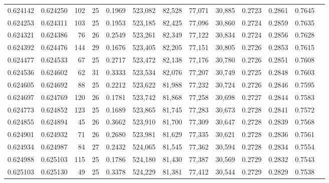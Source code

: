 \begin{tabular}{rrrrrrrrrrrrr}
0.624142 & 0.624250 & 102 &  25 &                                     0.1969 & 523,082 &  82,528 &  77,071 &  30,885 & 0.2723 & 0.2861 & 0.7645 \\
0.624253 & 0.624311 & 103 &  25 &                                     0.1953 & 523,185 &  82,425 &  77,096 &  30,860 & 0.2724 & 0.2859 & 0.7635 \\
0.624321 & 0.624386 &  76 &  26 &                                     0.2549 & 523,261 &  82,349 &  77,122 &  30,834 & 0.2724 & 0.2856 & 0.7628 \\
0.624392 & 0.624476 & 144 &  29 &                                     0.1676 & 523,405 &  82,205 &  77,151 &  30,805 & 0.2726 & 0.2853 & 0.7615 \\
0.624477 & 0.624533 &  67 &  25 &                                     0.2717 & 523,472 &  82,138 &  77,176 &  30,780 & 0.2726 & 0.2851 & 0.7608 \\
0.624536 & 0.624602 &  62 &  31 &                                     0.3333 & 523,534 &  82,076 &  77,207 &  30,749 & 0.2725 & 0.2848 & 0.7603 \\
0.624605 & 0.624692 &  88 &  25 &                                     0.2212 & 523,622 &  81,988 &  77,232 &  30,724 & 0.2726 & 0.2846 & 0.7595 \\
0.624697 & 0.624769 & 120 &  26 &                                     0.1781 & 523,742 &  81,868 &  77,258 &  30,698 & 0.2727 & 0.2844 & 0.7583 \\
0.624773 & 0.624852 & 123 &  25 &                                     0.1689 & 523,865 &  81,745 &  77,283 &  30,673 & 0.2728 & 0.2841 & 0.7572 \\
0.624855 & 0.624894 &  45 &  26 &                                     0.3662 & 523,910 &  81,700 &  77,309 &  30,647 & 0.2728 & 0.2839 & 0.7568 \\
0.624901 & 0.624932 &  71 &  26 &                                     0.2680 & 523,981 &  81,629 &  77,335 &  30,621 & 0.2728 & 0.2836 & 0.7561 \\
0.624934 & 0.624987 &  84 &  27 &                                     0.2432 & 524,065 &  81,545 &  77,362 &  30,594 & 0.2728 & 0.2834 & 0.7554 \\
0.624988 & 0.625103 & 115 &  25 &                                     0.1786 & 524,180 &  81,430 &  77,387 &  30,569 & 0.2729 & 0.2832 & 0.7543 \\
0.625103 & 0.625130 &  49 &  25 &                                     0.3378 & 524,229 &  81,381 &  77,412 &  30,544 & 0.2729 & 0.2829 & 0.7538 \\

\end{tabular}

